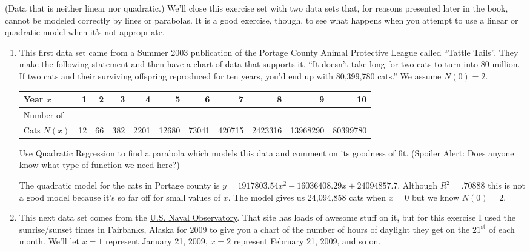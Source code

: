 \documentclass{ximera}
\begin{document}
\begin{problem}
(Data that is neither linear nor quadratic.)  We'll close this exercise set with two data sets that, for reasons presented later in the book, cannot be modeled correctly by lines or parabolas.  It is a good exercise, though, to see what happens when you attempt to use a linear or quadratic model when it's not appropriate.

\begin{enumerate}

\item \label{APLcats} This first data set came from a Summer 2003 publication of the Portage County Animal Protective League called ``Tattle Tails''.  They make the following statement and then have a chart of data that supports it. ``It doesn't take long for two cats to turn into 80 million.  If two cats and their surviving offspring reproduced for ten years, you'd end up with 80,399,780 cats.''  We assume $N(0) = 2$.


\begin{tabular}{|l|r|r|r|r|r|r|r|r|r|r|} \hline
Year $x$ & 1 & 2 & 3 & 4 & 5 & 6 & 7 & 8 & 9 & 10 \\ 
\hline 
Number of  & & & & & & & & & & \\
Cats $N(x)$ & 12 & 66 & 382 & 2201 & 12680 & 73041 & 420715 & 2423316 & 13968290 & 80399780 \\ \hline
\end{tabular}

\normalsize

\medskip

\noindent Use Quadratic Regression to find a parabola which models this data and comment on its goodness of fit. (Spoiler Alert: Does anyone know what type of function we need here?)

\medskip

\begin{solution}
    The quadratic model for the cats in Portage county is $y = 1917803.54x^{2} - 16036408.29x + 24094857.7$.  Although $R^{2} = .70888$ this is not a good model because it's so far off for small values of $x$.  The model gives us 24,094,858 cats when $x = 0$ but we know $N(0) = 2$.
\end{solution}


\item \label{regsunlight} This next data set comes from the \href{http://aa.usno.navy.mil/data/docs/RS_OneYear.php}{\underline{U.S. Naval Observatory}}.  That site has loads of awesome stuff on it, but for this exercise I used the sunrise/sunset times in Fairbanks, Alaska for 2009 to give you a chart of the number of hours of daylight they get on the $21^{\mbox{st}}$ of each month.  We'll let $x = 1$ represent January 21, 2009, $x = 2$ represent February 21, 2009, and so on.


\end{enumerate}
\end{problem}
\end{document}
